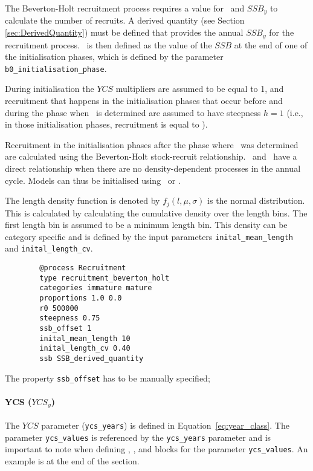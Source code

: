 The Beverton-Holt recruitment process requires a value for \Bzero\ and $SSB_y$ to calculate the number of recruits. A derived quantity (see Section \ref{sec:DerivedQuantity}) must be defined that provides the annual $SSB_y$ for the recruitment process. \Bzero\ is then defined as the value of the $SSB$ at the end of one of the initialisation phases, which is defined by the parameter \texttt{b0\_initialisation\_phase}.

During initialisation the $YCS$ multipliers are assumed to be equal to 1, and recruitment that happens in the initialisation phases that occur before and during the phase when \Bzero\ is determined are assumed to have steepness $h=1$ (i.e., in those initialisation phases, recruitment is equal to \Rzero).

Recruitment in the initialisation phases after the phase where \Bzero\ was determined are calculated using the Beverton-Holt stock-recruit relationship. \Rzero\ and \Bzero\ have a direct relationship when there are no density-dependent processes in the annual cycle. Models can thus be initialised using \Bzero\ or \Rzero.


The length density function is denoted by \(f_j(l,\mu, \sigma)\) is the normal distribution. This is calculated by calculating the cumulative density over the length bins. The first length bin is assumed to be a minimum length bin. This density can be category specific and is defined by the input parameters \texttt{inital\_mean\_length} and \texttt{inital\_length\_cv}.


{\small{\begin{verbatim}
		@process Recruitment
		type recruitment_beverton_holt
		categories immature mature
		proportions 1.0 0.0
		r0 500000
		steepness 0.75
		ssb_offset 1
		inital_mean_length 10
		inital_length_cv 0.40
		ssb SSB_derived_quantity
		\end{verbatim}}}

The property \texttt{ssb\_offset} has to be manually specified;

\paragraph*{YCS ($YCS_y$)}

The $YCS$ parameter (\texttt{ycs\_years}) is defined in Equation~\eqref{eq:year_class}. The parameter \texttt{ycs\_values} is referenced by the \texttt{ycs\_years} parameter and is important to note when defining , , and  blocks for the parameter \texttt{ycs\_values}. An example is at the end of the section.

